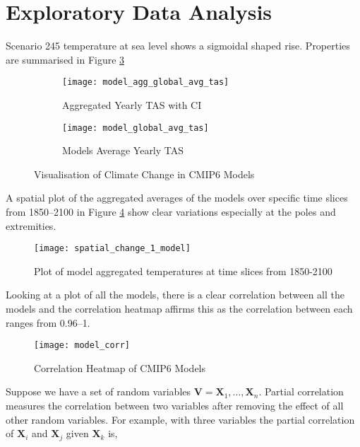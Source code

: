 \documentclass[honours,12pt]{unswthesis}
\numberwithin{equation}{section}
\begin{document}
\section{Exploratory Data Analysis}\label{eda}
Scenario 245 temperature at sea level shows a sigmoidal shaped rise. Properties are summarised in Figure \ref{fig:cmip6_plots}

\begin{figure}[H]
    \centering
    \begin{subfigure}[b]{0.45\textwidth}
        \centering
        \texttt{[image: model\_agg\_global\_avg\_tas]}
        \caption{Aggregated Yearly TAS with CI}
        \label{fig:agg_models}
    \end{subfigure}
    \hfill
    \begin{subfigure}[b]{0.45\textwidth}
        \centering
        \texttt{[image: model\_global\_avg\_tas]}
        \caption{Models Average Yearly TAS}
        \label{fig:model_avgs}
    \end{subfigure}
    \caption{Visualisation of Climate Change in CMIP6 Models}
    \label{fig:cmip6_plots}
\end{figure}

{\noindent}A spatial plot of the aggregated averages of the models over specific time slices from 1850--2100 in Figure \ref{fig:slice_maps} show clear variations especially at the poles and extremities.

\begin{figure}[H]
    \centering
    \texttt{[image: spatial\_change\_1\_model]}
    \caption{Plot of model aggregated temperatures at time slices from 1850-2100}
    \label{fig:slice_maps}
\end{figure}

\noindent Looking at a plot of all the models, there is a clear correlation between all the models and the correlation heatmap affirms this as the correlation between each
ranges from 0.96--1.

\begin{figure}[H]
    \centering
    \texttt{[image: model\_corr]}
    \caption{Correlation Heatmap of CMIP6 Models}
    \label{fig:corr_plot}
\end{figure}

{\noindent}Suppose we have a set of random variables $\textbf{V} = \textbf{X}_1, \dots, \textbf{X}_n$. 
Partial correlation measures the correlation between two variables after removing the effect of all other random variables.\cite{kim2015ppcor}
For example, with three variables the partial correlation of $\textbf{X}_i$ and $\textbf{X}_j$ given $\textbf{X}_k$ is,
\end{document}
